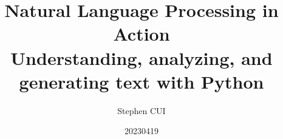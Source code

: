 \documentclass[openany]{book}
\title{\textbf{Natural Language Processing in Action}\\
Understanding, analyzing, and generating text with Python
}
\author{Stephen CUI}
\date{20230419}
\begin{document}
\maketitle
\part{}
\end{document}
